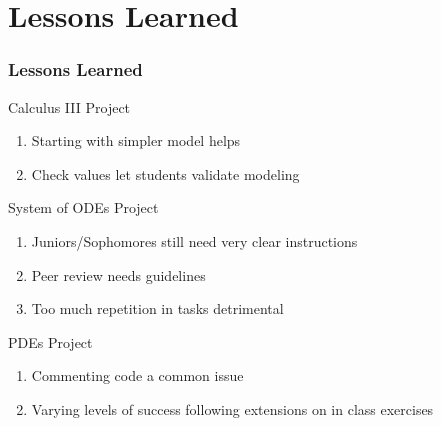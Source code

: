 \documentclass{beamer}
\begin{document}
\section{Lessons Learned}

\begin{frame}
\begin{center}
\frametitle{Lessons Learned}

Calculus III Project

\begin{enumerate}

\item Starting with simpler model helps

\item Check values let students validate modeling

\end{enumerate}

System of ODEs Project

\begin{enumerate}

\item Juniors/Sophomores still need very clear instructions

\item Peer review needs guidelines

\item Too much repetition in tasks detrimental

\end{enumerate}

PDEs Project

\begin{enumerate}

\item Commenting code a common issue

\item Varying levels of success following extensions on in class exercises

\end{enumerate}

\end{center}
\end{frame}

\section{}

\begin{frame}[noframenumbering]
\titlepage %
\end{frame}


\end{document}
